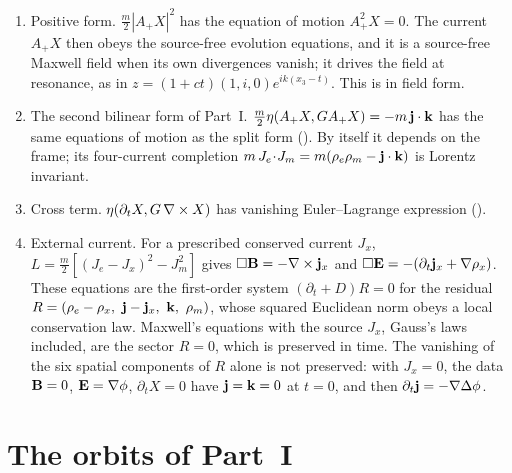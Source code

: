 \begin{proposition}
\label{prop:forms}
\begin{enumerate}[label=(\roman*),leftmargin=2.2em,itemsep=1pt]
\item Positive form. $\tfrac m2|A_+X|^2$ has the equation of motion $A_+^2X=0$. The current $A_+X$ then obeys the source-free evolution
equations, and it is a source-free Maxwell field when its own divergences vanish; it drives the field at resonance, as in
$z=(1+ct)(1,i,0)e^{ik(x_3-t)}$. This is  in field form.
\item The second bilinear form of Part~I. $\tfrac m2\eta(A_+X,GA_+X)=-m\,\mathbf j\cdot\mathbf k$ has the same equations of motion as the split
form (). By itself it depends on the frame; its four-current completion $m\,J_e\!\cdot\!J_m=m(\rho_e\rho_m-\mathbf j\cdot\mathbf k)$
is Lorentz invariant.
\item Cross term. $\eta(\partial_tX,G\,\nabla\times X)$ has vanishing Euler--Lagrange expression ().
\item External current. For a prescribed conserved current $J_x$, $L=\tfrac m2[(J_e-J_x)^2-J_m^2]$ gives $\Box\mathbf B=-\nabla\times\mathbf j_x$ and
$\Box\mathbf E=-(\partial_t\mathbf j_x+\nabla\rho_x)$. These equations are the first-order system $(\partial_t+D)R=0$ for the residual
$R=(\rho_e-\rho_x,\ \bj-\bj_x,\ \bk,\ \rho_m)$, whose squared Euclidean norm obeys a local conservation law. Maxwell's equations with the
source $J_x$, Gauss's laws included, are the sector $R=0$, which is preserved in time. The vanishing of the six spatial components of $R$
alone is not preserved: with $J_x=0$, the data $\mathbf B=0$, $\mathbf E=\nabla\phi$, $\partial_tX=0$ have $\mathbf j=\mathbf k=0$ at $t=0$, and then
$\partial_t\mathbf j=-\nabla\Delta\phi$.
\end{enumerate}
\end{proposition}

\section{The orbits of Part~I}

